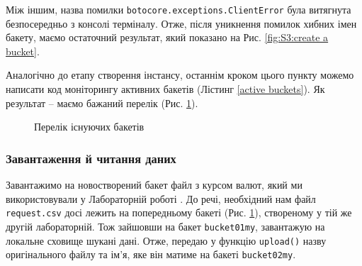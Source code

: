 \documentclass[a4paper,14pt]{extarticle} %
\begin{document}
Між іншим, назва помилки \texttt{botocore.exceptions.ClientError} була витягнута безпосередньо з консолі 
терміналу. Отже, після уникнення помилок хибних імен бакету, маємо остаточний результат, який показано на Рис. 
\ref{fig:S3:create a bucket}.

Аналогічно до етапу створення інстансу, останнім кроком цього пункту можемо написати код моніторингу активних 
бакетів (Лістинг \ref{active buckets}). Як результат -- маємо бажаний перелік (Рис. \ref{fig:S3:active buckets}).



\begin{figure}[H]
    \caption{Перелік існуючих бакетів}
    \label{fig:S3:active buckets}
\end{figure}

\subsubsection*{Завантаження й читання даних}

Завантажимо на новостворений бакет файл з курсом валют, який ми використовували у Лабораторній роботі 
. До речі, необхідний нам файл \texttt{request.csv} досі лежить на попередньому бакеті 
(Рис. \ref{fig:S3:active buckets}), створеному у тій же другій лабораторній. Тож зайшовши на бакет 
\texttt{bucket01my}, завантажую на локальне сховище шукані дані. Отже, передаю у функцію \texttt{upload()} 
назву оригінального файлу та ім'я, яке він матиме на бакеті \texttt{bucket02my}. 


\end{document}
